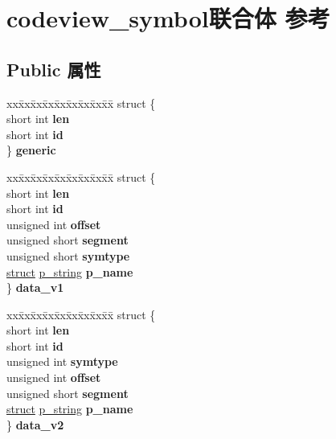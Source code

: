 \hypertarget{unioncodeview__symbol}{}\section{codeview\+\_\+symbol联合体 参考}
\label{unioncodeview__symbol}
\subsection*{Public 属性}
\begin{DoxyCompactItemize}
\item 
\mbox{\label{unioncodeview__symbol_ac7dc9398700d84b2b9ebc4a274489682}} 
\begin{tabbing}
xx\=xx\=xx\=xx\=xx\=xx\=xx\=xx\=xx\=\kill
struct \{\\
\>short int {\bfseries len}\\
\>short int {\bfseries id}\\
\} {\bfseries generic}\\

\end{tabbing}\item 
\mbox{\label{unioncodeview__symbol_aaefa184802882c221d44ba52aa68dc58}} 
\begin{tabbing}
xx\=xx\=xx\=xx\=xx\=xx\=xx\=xx\=xx\=\kill
struct \{\\
\>short int {\bfseries len}\\
\>short int {\bfseries id}\\
\>unsigned int {\bfseries offset}\\
\>unsigned short {\bfseries segment}\\
\>unsigned short {\bfseries symtype}\\
\>\hyperlink{interfacestruct}{struct} \hyperlink{structp__string}{p\_string} {\bfseries p\_name}\\
\} {\bfseries data\_v1}\\

\end{tabbing}\item 
\mbox{\label{unioncodeview__symbol_a9f1b2b1c344b407726c07c0984387cad}} 
\begin{tabbing}
xx\=xx\=xx\=xx\=xx\=xx\=xx\=xx\=xx\=\kill
struct \{\\
\>short int {\bfseries len}\\
\>short int {\bfseries id}\\
\>unsigned int {\bfseries symtype}\\
\>unsigned int {\bfseries offset}\\
\>unsigned short {\bfseries segment}\\
\>\hyperlink{interfacestruct}{struct} \hyperlink{structp__string}{p\_string} {\bfseries p\_name}\\
\} {\bfseries data\_v2}\\


\end{tabbing}
\end{DoxyCompactItemize}
